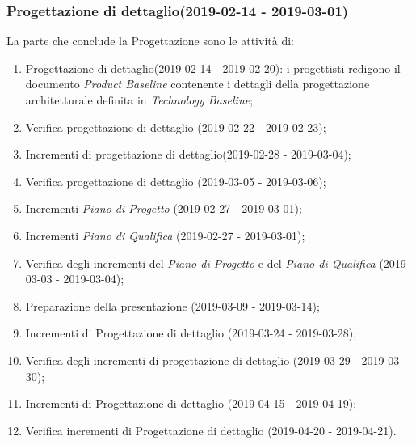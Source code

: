 		\subsubsection{Progettazione di dettaglio(2019-02-14 - 2019-03-01)\\} La parte che conclude la Progettazione sono le attività di:
			\begin{enumerate}[label = 3.3.\arabic*)]
				\item Progettazione di dettaglio(2019-02-14 - 2019-02-20): i progettisti redigono il documento \textit{Product Baseline} contenente i dettagli della progettazione architetturale definita in \textit{Technology Baseline};
				\item Verifica progettazione di dettaglio (2019-02-22 - 2019-02-23);
				\item Incrementi di progettazione di dettaglio(2019-02-28 - 2019-03-04);
				\item Verifica progettazione di dettaglio (2019-03-05 - 2019-03-06);
				\item Incrementi \textit{Piano di Progetto} (2019-02-27 - 2019-03-01);
				\item Incrementi \textit{Piano di Qualifica} (2019-02-27 - 2019-03-01);	
				\item Verifica degli incrementi del \textit{Piano di Progetto} e del \textit{Piano di Qualifica} (2019-03-03 - 2019-03-04);
				\item Preparazione della presentazione (2019-03-09 - 2019-03-14);
				\item Incrementi di Progettazione di dettaglio (2019-03-24 - 2019-03-28);
				\item Verifica degli incrementi di progettazione di dettaglio (2019-03-29 - 2019-03-30);
				\item Incrementi di Progettazione di dettaglio (2019-04-15 - 2019-04-19);
				\item Verifica incrementi di Progettazione di dettaglio (2019-04-20 - 2019-04-21).
			\end{enumerate}
	
